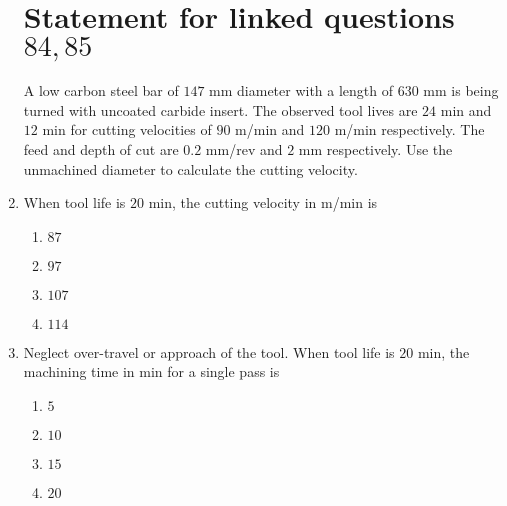 \documentclass[journal,12pt,twocolumn]{IEEEtran}
\theoremstyle{remark}
\begin{document}
\begin{enumerate}[start=69]
                            \section{Statement for linked questions$84 , 85$}
                         A low carbon steel bar of $147$ mm diameter with a length of $630$ mm is being turned with uncoated carbide insert. The observed tool lives are $24$ min and $12$ min for cutting velocities of $90$ m/min and $120$ m/min respectively. The feed and depth of cut are $0.2$ mm/rev and $2$ mm respectively. Use the unmachined diameter to calculate the cutting velocity.
                         \item When tool life is $20$ min, the cutting velocity in m/min is
                            \begin{enumerate}
                               \item  $87$ 
                               \item  $97$ 
                                \item $107$ 
                                \item $114$
                            \end{enumerate}
                        
                            \item Neglect over-travel or approach of the tool. When tool life is $20$ min, the machining time in min for a single pass is
                            \begin{enumerate}
                               \item  $5$
                                \item $10$ 
                                \item $15$ 
                                \item $20$
                            \end{enumerate}
                        \end{enumerate}
                        
\end{document}

